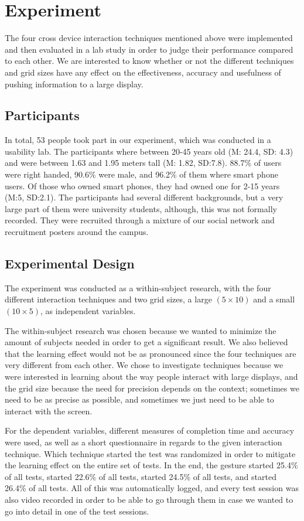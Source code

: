 \section{Experiment} \label{sec:experiment}
The four cross device interaction techniques mentioned above were implemented and then evaluated in a lab study in order to judge their performance compared to each other. We are interested to know whether or not the different techniques and grid sizes have any effect on the effectiveness, accuracy and usefulness of pushing information to a large display. 

\subsection{Participants}
In total, 53 people took part in our experiment, which was conducted in a usability lab. 
The participants where between 20-45 years old (M: 24.4, SD: 4.3) and were between 1.63 and 1.95 meters tall (M: 1.82, SD:7.8). 
88.7\% of users were right handed, 90.6\% were male, and 96.2\% of them where smart phone users. 
Of those who owned smart phones, they had owned one for 2-15 years (M:5, SD:2.1). 
The participants had several different backgrounds, but a very large part of them were university students, although, this was not formally recorded. 
They were recruited through a mixture of our social network and recruitment posters around the campus. 

\subsection{Experimental Design}\label{sec:expdesign}
The experiment was conducted as a within-subject research, with the four different interaction techniques and two grid sizes, a large $(5 \times 10)$ and a small $(10 \times 5)$, as independent variables. 

The within-subject research was chosen because we wanted to minimize the amount of subjects needed in order to get a significant result. We also believed that the learning effect would not be as pronounced since the four techniques are very different from each other. 
We chose to investigate techniques because we were interested in learning about the way people interact with large displays, and the grid size because the need for precision depends on the context; sometimes we need to be as precise as possible, and sometimes we just need to be able to interact with the screen. 

For the dependent variables, different measures of completion time and accuracy were used, as well as a short questionnaire in regards to the given interaction technique. 
Which technique started the test was randomized in order to mitigate the learning effect on the entire set of tests. 
In the end, the \pinch gesture started 25.4\% of all tests, \swipe started 22.6\% of all tests, \throw started 24.5\% of all tests, and \tilt started 26.4\% of all tests. 
All of this was automatically logged, and every test session was also video recorded in order to be able to go through them in case we wanted to go into detail in one of the test sessions.

